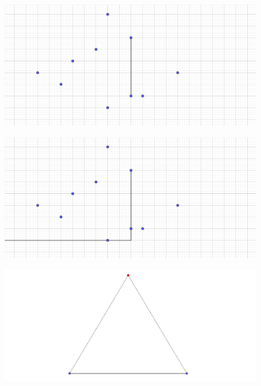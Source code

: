 \documentclass{beamer}
\begin{document}
\begin{frame}
\begin{figure}[h]
\includegraphics[width=\textwidth]{Prueba-misma-vertical-2}
\end{figure}
\end{frame}
\begin{frame}
\begin{figure}[h]
\includegraphics[width=\textwidth]{Prueba-misma-vertical-3}
\end{figure}
\end{frame}
\begin{frame}
\begin{figure}[h]
\includegraphics[width=\textwidth]{Tokunaga}
\end{figure}
\end{frame}
\end{document}
